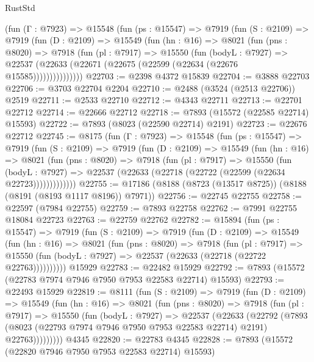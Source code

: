 \begin{lexlean}{RustStd}
\begin{coremodule}
      (fun (Γ : @7923) =>
      @15548
        (fun (ps : @15547) =>
        @7919
          (fun (S : @2109) =>
          @7919
            (fun (D : @2109) =>
            @15549
              (fun (hn : @16) =>
              @8021
                (fun (pns : @8020) =>
                @7918
                  (fun (pl : @7917) =>
                  @15550
                    (fun (bodyL : @7927) =>
                    @22537 (@22633 (@22671 (@22675 (@22599 (@22634 (@22676 @15585)))))))))))))))
@22703 := @2398 @4372 @15839
@22704 := @3888 @22703
@22706 := @3703 @22704 @2204
@22710 := @2488 (@3524 (@2513 @22706)) @2519
@22711 := @2533 @22710
@22712 := @4343 @22711
@22713 := @22701 @22712
@22714 := @22666 @22712
@22718 := @7893 (@15572 (@22585 @22714) @15593)
@22722 := @7893 (@8023 (@22590 @22714) @2191)
@22723 := @22676 @22712
@22745 := @8175
    (fun (Γ : @7923) =>
    @15548
      (fun (ps : @15547) =>
      @7919
        (fun (S : @2109) =>
        @7919
          (fun (D : @2109) =>
          @15549
            (fun (hn : @16) =>
            @8021
              (fun (pns : @8020) =>
              @7918
                (fun (pl : @7917) =>
                @15550
                  (fun (bodyL : @7927) =>
                  @22537 (@22633 (@22718 (@22722 (@22599 (@22634 @22723)))))))))))))
@22755 := @17186 (@8188 (@8723 (@13517 @8725)) (@8188 (@8191 (@8193 @1117 @8196)) @7971))
@22756 := @22745 @22755
@22758 := @22597 (@7984 @22755)
@22759 := @7893 @22758
@22762 := @7991 @22755 @18084 @22723
@22763 := @22759 @22762
@22782 := @15894
    (fun (ps : @15547) =>
    @7919
      (fun (S : @2109) =>
      @7919
        (fun (D : @2109) =>
        @15549
          (fun (hn : @16) =>
          @8021
            (fun (pns : @8020) =>
            @7918
              (fun (pl : @7917) =>
              @15550 (fun (bodyL : @7927) => @22537 (@22633 (@22718 (@22722 @22763))))))))))
    @15929
@22783 := @22482 @15929
@22792 := @7893 (@15572 (@22783 @7974 @7946 @7950 @7953 @22583 @22714) @15593)
@22793 := @22493 @15929
@22819 := @8111
    (fun (S : @2109) =>
    @7919
      (fun (D : @2109) =>
      @15549
        (fun (hn : @16) =>
        @8021
          (fun (pns : @8020) =>
          @7918
            (fun (pl : @7917) =>
            @15550
              (fun (bodyL : @7927) =>
              @22537
                (@22633
                  (@22792
                    (@7893
                      (@8023 (@22793 @7974 @7946 @7950 @7953 @22583 @22714) @2191)
                      @22763)))))))))
    @4345
@22820 := @22783 @4345
@22828 := @7893 (@15572 (@22820 @7946 @7950 @7953 @22583 @22714) @15593)

\end{coremodule}
\end{lexlean}
